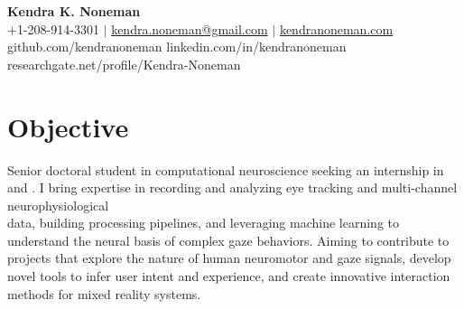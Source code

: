 \documentclass[letterpaper,10pt]{article}
\begin{document}
\begin{center}
    {\huge \color{title}\textbf{Kendra K. Noneman}} \\[8pt]
    {$+$1-208-914-3301  \hspace{1 pt} $\vert$ \hspace{1 pt} \href{mailto:kendra.noneman@gmail.com}{kendra.noneman@gmail.com} \hspace{1 pt} $\vert$ \hspace{1 pt} \href{https://kendranoneman.com}{kendranoneman.com} \\[4pt]}
    \small{\href{https://github.com/kendranoneman}{\faGithub} \hspace*{-2pt} github.com/kendranoneman \hspace{5 pt} \href{www.linkedin.com/in/kendranoneman}{\faLinkedinSquare} \hspace*{-2pt} linkedin.com/in/kendranoneman \hspace{5 pt} \href{https://www.researchgate.net/profile/Kendra-Noneman}{\aiResearchGateSquare} \hspace{-2pt} researchgate.net/profile/Kendra-Noneman}
\end{center}

\section{Objective}
  {Senior doctoral student in computational neuroscience seeking an internship in  and . I bring expertise in recording and analyzing eye tracking and multi-channel neurophysiological \\ data, building processing pipelines, and leveraging machine learning to understand the neural basis of complex gaze behaviors. Aiming to contribute to projects that explore the nature of human neuromotor and gaze signals, develop \\ novel tools to infer user intent and experience, and create innovative interaction methods for mixed reality systems.}
  \vspace*{-0.1cm}
  
\end{document}
